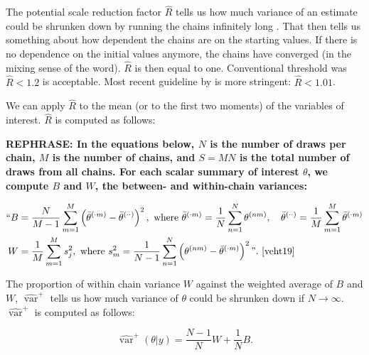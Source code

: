 \documentclass[article]{jss}
\begin{document}
The potential scale reduction factor $\widehat{R}$ tells us how much variance of an estimate could be shrunken down by running the chains infinitely long \cite{gelm92}. That then tells us something about how dependent the chains are on the starting values. If there is no dependence on the initial values anymore, the chains have converged (in the mixing sense of the word). $\widehat{R}$ is then equal to one. Conventional threshold was $\widehat{R} < 1.2$ is acceptable. Most recent guideline by \cite{veht19} is more stringent: $\widehat{R} < 1.01$. 

We can apply $\widehat{R}$ to the mean (or to the first two moments) of the variables of interest. $\widehat{R}$ is computed as follows: %

\textbf{REPHRASE: In the equations below, $N$ is the number of draws per chain, $M$ is the number of chains, and $S = MN$ is the total number of draws from all chains. For each scalar summary of interest $\theta$, we compute $B$ and $W$, the between- and within-chain variances:}

\begin{align*}
``B&=\frac{N}{M-1} \sum_{m=1}^{M}\left(\bar{\theta}^{(\cdot m)}-\bar{\theta}^{(\cdot \cdot)}\right)^{2}, \text { where } \bar{\theta}^{(\cdot m)}=\frac{1}{N} \sum_{n=1}^{N} \theta^{(n m)}, \quad \bar{\theta}^{(\cdot \cdot)}=\frac{1}{M} \sum_{m=1}^{M} \bar{\theta}^{(\cdot m)} \\
W&=\frac{1}{M} \sum_{m=1}^{M} s_{j}^{2},  \text { where } s_{m}^{2}=\frac{1}{N-1} \sum_{n=1}^{N}\left(\theta^{(n m)}-\bar{\theta}^{(\cdot m)}\right)^{2}". \text{ \cite[p.~5]{veht19}} 
\end{align*}


The proportion of within chain variance $W$ against the weighted average of $B$ and $W$, $\widehat{\operatorname{var}}^{+}$ tells us how much variance of $\theta$ could be shrunken down if $N\to\infty$. $\widehat{\operatorname{var}}^{+}$ is computed as follows: %

\begin{equation*}
\widehat{\operatorname{var}}^{+}(\theta | y)=\frac{N-1}{N} W+\frac{1}{N} B.
\end{equation*}
\end{document}
